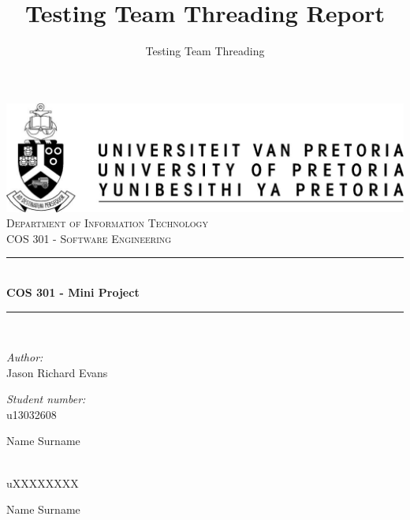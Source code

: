 \documentclass[a4paper,12pt]{report}
\author{Testing Team Threading}
\title{ Testing Team Threading Report}
\newcommand{\HRule}{\rule{\linewidth}{0.5mm}}
\begin{document}
\setlength{\parskip}{6pt}

\begin{titlepage}

\begin{center}
\includegraphics[width=1\textwidth]{./up-logo.jpg}\\[0.4cm]    
\textsc{\LARGE Department of Information Technology}\\[1.5cm]
\textsc{\Large COS 301 - Software Engineering}\\[0.5cm]
\HRule \\[0.4cm]
{ \huge \bfseries COS 301 - Mini Project}\\[0.4cm]
\HRule \\[0.4cm]
\begin{minipage}{0.4\textwidth}
\begin{flushleft} \large
\emph{Author:}\\
Jason {Richard Evans}
\end{flushleft}
\end{minipage}
\begin{minipage}{0.4\textwidth}
\begin{flushright} \large
\emph{Student number:} \\
u13032608
\end{flushright}
\end{minipage}
\begin{minipage}{0.4\textwidth}
\begin{flushleft} \large
Name {Surname}
\end{flushleft}
\end{minipage}
\begin{minipage}{0.4\textwidth}
\begin{flushright} \large
\emph{} \\
uXXXXXXXX
\end{flushright}
\end{minipage}
\begin{minipage}{0.4\textwidth}
\begin{flushleft} \large
Name {Surname}
\end{flushleft}

\end{minipage}
\end{center}
\end{titlepage}
\end{document}
